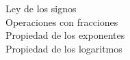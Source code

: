 \documentclass[preview]{standalone}
\begin{document}
Ley de los signos\\Operaciones con fracciones\\Propiedad de los exponentes\\Propiedad de los logaritmos\\
\end{document}
